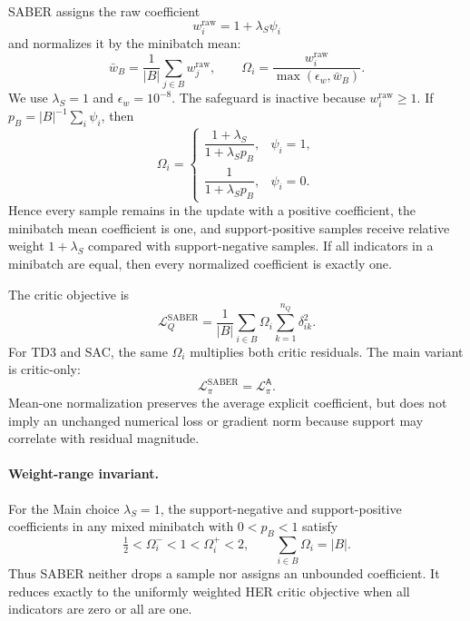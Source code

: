 SABER assigns the raw coefficient
\begin{equation}
w_i^{\mathrm{raw}}=1+\lambda_S\psi_i
\label{eq:supp-raw-weight}
\end{equation}
and normalizes it by the minibatch mean:
\begin{equation}
\bar w_B=
\frac{1}{|B|}\sum_{j\in B}w_j^{\mathrm{raw}},
\qquad
\Omega_i=
\frac{w_i^{\mathrm{raw}}}
{\max(\epsilon_w,\bar w_B)}.
\label{eq:supp-normalized-weight}
\end{equation}
We use \(\lambda_S=1\) and \(\epsilon_w=10^{-8}\). The safeguard is inactive
because \(w_i^{\mathrm{raw}}\geq1\). If
\(p_B=|B|^{-1}\sum_i\psi_i\), then
\begin{equation}
\Omega_i=
\begin{cases}
\dfrac{1+\lambda_S}{1+\lambda_Sp_B}, & \psi_i=1,\\[2mm]
\dfrac{1}{1+\lambda_Sp_B}, & \psi_i=0.
\end{cases}
\label{eq:supp-closed-form-weight}
\end{equation}
Hence every sample remains in the update with a positive coefficient, the
minibatch mean coefficient is one, and support-positive samples receive
relative weight \(1+\lambda_S\) compared with support-negative samples. If all
indicators in a minibatch are equal, then every normalized coefficient is
exactly one.

The critic objective is
\begin{equation}
\mathcal L_Q^{\mathrm{SABER}}
=\frac{1}{|B|}
\sum_{i\in B}\Omega_i
\sum_{k=1}^{n_Q}\delta_{ik}^2.
\label{eq:supp-saber-critic-loss}
\end{equation}
For TD3 and SAC, the same \(\Omega_i\) multiplies both critic residuals. The
main variant is critic-only:
\begin{equation}
\mathcal L_\pi^{\mathrm{SABER}}
=\mathcal L_\pi^{\mathsf A}.
\label{eq:supp-unchanged-actor}
\end{equation}
Mean-one normalization preserves the average explicit coefficient, but does
not imply an unchanged numerical loss or gradient norm because support may
correlate with residual magnitude.

\paragraph{Weight-range invariant.}
For the Main choice \(\lambda_S=1\), the support-negative and support-positive
coefficients in any mixed minibatch with \(0<p_B<1\) satisfy
\[
\tfrac12<\Omega_i^{-}<1<\Omega_i^{+}<2,
\qquad \sum_{i\in B}\Omega_i=|B|.
\]
Thus SABER neither drops a sample nor assigns an unbounded coefficient. It
reduces exactly to the uniformly weighted HER critic objective when all
indicators are zero or all are one.

